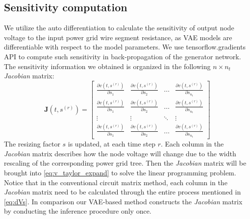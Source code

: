 \subsection{Sensitivity computation}
\label{subsec:new_sensivity}
We utilize the auto differentiation to calculate the sensitivity of output node voltage to the input power grid wire segment resistance, as VAE models are differentiable with respect to the model parameters.
  We use tensorflow.gradients API to compute such sensitivity in back-propagation of the generator network. 
The sensitivity information we obtained is organized in the following $n \times n_{t}$ \textit{Jacobian} matrix:
\begin{equation}
\label{eq:partial_jacob}
\mathbf J(t, s^{(r)})  =
\begin{bmatrix}
\frac{\partial v(t, s^{(r)})}{\partial s_{1}}&\frac{\partial v(t, s^{(r)})}{\partial s_{2}}&\ldots&\frac{\partial v(t, s^{(r)})}{\partial s_{n_{t}}}\\
\frac{\partial v(t, s^{(r)})}{\partial s_{1}}&\frac{\partial v(t, s^{(r)})}{\partial s_{2}}&\ldots&\frac{\partial v(t, s^{(r)})}{\partial s_{n_{t}}}\\
\vdots&\vdots&\ddots&\vdots\\
\frac{\partial v(t, s^{(r)})}{\partial s_{1}}&\frac{\partial v(t, s^{(r)})}{\partial s_{2}}&\ldots&\frac{\partial v(t, s^{(r)})}{\partial s_{n_{t}}}
\end{bmatrix}
\end{equation}
The resizing factor $s$ is updated, at each time step $r$.  Each column in the \textit{Jacobian} matrix describes how the node voltage will change due to the width rescaling of the corresponding power grid tree.
Then the \textit{Jacobian} matrix will be brought into  \eqref{eq:v_taylor_expand} to solve the linear programming problem. 
Notice that in the conventional circuit matrix method, each column in the \textit{Jacobian} matrix need to be calculated through the entire process mentioned in \eqref{eq:dVs}. In comparison our VAE-based method constructs the \textit{Jacobian} matrix by conducting the inference procedure only once.




